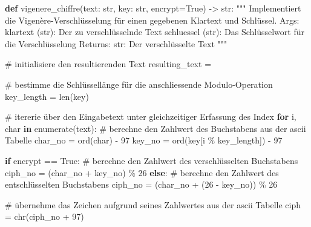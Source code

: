 \documentclass[
  nswissgerman,
  a4paper,
  DIV=11,
  numbers=noendperiod,
  ngerman]{scrreprt}
\newenvironment{Shaded}{\begin{snugshade}}{\end{snugshade}}
\newcommand{\BuiltInTok}[1]{\textcolor[rgb]{0.00,0.23,0.31}{#1}}
\newcommand{\CommentTok}[1]{\textcolor[rgb]{0.37,0.37,0.37}{#1}}
\newcommand{\ControlFlowTok}[1]{\textcolor[rgb]{0.00,0.23,0.31}{\textbf{#1}}}
\newcommand{\DecValTok}[1]{\textcolor[rgb]{0.68,0.00,0.00}{#1}}
\newcommand{\KeywordTok}[1]{\textcolor[rgb]{0.00,0.23,0.31}{\textbf{#1}}}
\newcommand{\NormalTok}[1]{\textcolor[rgb]{0.00,0.23,0.31}{#1}}
\newcommand{\OperatorTok}[1]{\textcolor[rgb]{0.37,0.37,0.37}{#1}}
\newcommand{\StringTok}[1]{\textcolor[rgb]{0.13,0.47,0.30}{#1}}
\newcommand{\VariableTok}[1]{\textcolor[rgb]{0.07,0.07,0.07}{#1}}
\begin{document}
\begin{Shaded}
\begin{Highlighting}[numbers=left,,]
\KeywordTok{def}\NormalTok{ vigenere\_chiffre(text: }\BuiltInTok{str}\NormalTok{, key: }\BuiltInTok{str}\NormalTok{, encrypt}\OperatorTok{=}\VariableTok{True}\NormalTok{) }\OperatorTok{{-}\textgreater{}} \BuiltInTok{str}\NormalTok{:}
    \CommentTok{"""}
\CommentTok{    Implementiert die Vigenère{-}Verschlüsselung für einen gegebenen Klartext und}
\CommentTok{    Schlüssel.}
\CommentTok{    }
\CommentTok{    Args:}
\CommentTok{        klartext (str): Der zu verschlüsselnde Text schluessel (str): Das}
\CommentTok{        Schlüsselwort für die Verschlüsselung}
\CommentTok{    }
\CommentTok{    Returns:}
\CommentTok{        str: Der verschlüsselte Text}
\CommentTok{    """}
    
    \CommentTok{\# initialisiere den resultierenden Text}
\NormalTok{    resulting\_text }\OperatorTok{=} \StringTok{\textquotesingle{}\textquotesingle{}}
    
    \CommentTok{\# bestimme die Schlüssellänge für die anschliessende Modulo{-}Operation}
\NormalTok{    key\_length }\OperatorTok{=} \BuiltInTok{len}\NormalTok{(key)}
    
    \CommentTok{\# itererie über den Eingabetext unter gleichzeitiger Erfassung des Index}
    \ControlFlowTok{for}\NormalTok{ i, char }\KeywordTok{in} \BuiltInTok{enumerate}\NormalTok{(text):}
        \CommentTok{\# berechne den Zahlwert des Buchstabens aus der ascii Tabelle}
\NormalTok{        char\_no }\OperatorTok{=} \BuiltInTok{ord}\NormalTok{(char) }\OperatorTok{{-}} \DecValTok{97}
\NormalTok{        key\_no }\OperatorTok{=} \BuiltInTok{ord}\NormalTok{(key[i }\OperatorTok{\%}\NormalTok{ key\_length]) }\OperatorTok{{-}} \DecValTok{97}
        
        \ControlFlowTok{if}\NormalTok{ encrypt }\OperatorTok{==} \VariableTok{True}\NormalTok{:}
            \CommentTok{\# berechne den Zahlwert des verschlüsselten Buchstabens}
\NormalTok{            ciph\_no }\OperatorTok{=}\NormalTok{ (char\_no }\OperatorTok{+}\NormalTok{ key\_no) }\OperatorTok{\%} \DecValTok{26}
        \ControlFlowTok{else}\NormalTok{:}
            \CommentTok{\# berechne den Zahlwert des entschlüsselten Buchstabens}
\NormalTok{            ciph\_no }\OperatorTok{=}\NormalTok{ (char\_no }\OperatorTok{+}\NormalTok{ (}\DecValTok{26} \OperatorTok{{-}}\NormalTok{ key\_no)) }\OperatorTok{\%} \DecValTok{26}
            
         \CommentTok{\# übernehme das Zeichen aufgrund seines Zahlwertes aus der ascii Tabelle  }
\NormalTok{        ciph }\OperatorTok{=} \BuiltInTok{chr}\NormalTok{(ciph\_no }\OperatorTok{+} \DecValTok{97}\NormalTok{)}
        

\end{Highlighting}
\end{Shaded}
\end{document}
